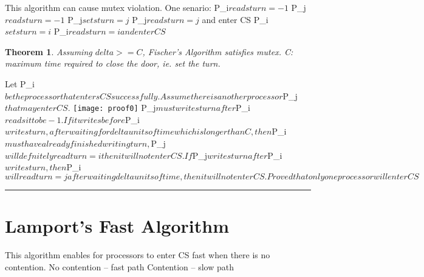 \documentclass[twoside]{article}
\newcounter{lecnum}
\newtheorem{theorem}{Theorem}[lecnum]
\newenvironment{proof}{{\bf Proof:}}{\hfill\rule{2mm}{2mm}}
\begin{document}
This algorithm can cause mutex violation. One senario:\newline
P_i$ reads turn = -1$\newline
P_j$ reads turn = -1$\newline
P_j$ sets turn = j$\newline
P_j$ reads turn = j$ and enter CS\newline
P_i$ sets turn = i$\newline
P_i$ reads turn = i and enter CS$\newline

\begin{theorem}
Assuming $delta >= C$, Fischer's Algorithm satisfies mutex. C: maximum time required to close the door, ie. set the turn.
\end{theorem}

\begin{proof}
Let P_i$ be the processor that enters CS successfully. Assume there is another processor $P_j$ that may enter CS.$\newline
  \texttt{[image: proof0]}\newline
P_j$ must writes turn after $P_i$ reads it to be -1. If it writes before $P_i$ writes turn, after waiting for delta units of time which is longer than C, then $P_i$ must have already finished writing turn, $P_j$ will defnitely read turn = i then it will not enter CS. If $P_j$ writes turn after $P_i$ writes turn, then $P_i$ will read turn = j after waiting delta units of time, then it will not enter CS. Proved that only one processor will enter CS$
\end{proof}

\section{Lamport's Fast Algorithm}
This algorithm enables for processors to enter CS fast when there is no contention. \newline
No contention -- fast path
Contention -- slow path
\end{document}
